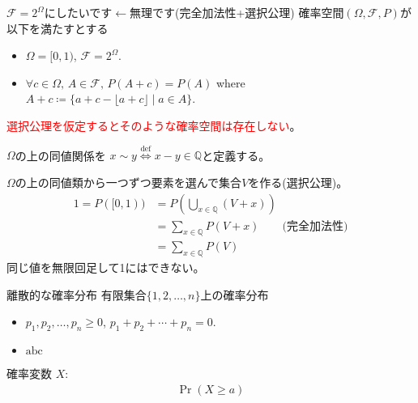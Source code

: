 \documentclass[lualatex,handout]{beamer}
\newcommand{\emm}[1]{\textcolor{red}{#1}}
\theoremstyle{definition}
\begin{document}
\begin{frame}{$\mathcal{F} = 2^\Omega$にしたいです$\leftarrow$無理です(完全加法性+選択公理)}
\small
確率空間$(\Omega,\mathcal{F},P)$が以下を満たすとする
\begin{itemize}
\item $\Omega=[0,1)$, $\mathcal{F} = 2^\Omega$.
\item $\forall c\in\Omega,\, A\in\mathcal{F},\, P(A+c) = P(A)$ where $A+c\coloneq\{a+c-\lfloor a+c\rfloor\mid a\in A\}$.
\end{itemize}
\emm{選択公理を仮定するとそのような確率空間は存在しない}。

\vspace{1em}
$\Omega$の上の同値関係を
$x\sim y\stackrel{\mathrm{def}}{\iff} x-y \in\mathbb{Q}$と定義する。

\vspace{1em}
$\Omega$の上の同値類から一つずつ要素を選んで集合$V$を作る(選択公理)。
%
\begin{align*}
1 = P([0,1)) &= P\left(\bigcup_{x\in\mathbb{Q}} (V + x)\right)\\
&= \sum_{x\in\mathbb{Q}} P\left(V + x\right)\qquad\text{(完全加法性)}\\
&= \sum_{x\in\mathbb{Q}} P\left(V\right)
\end{align*}
同じ値を無限回足して1にはできない。
\end{frame}

\begin{frame}{離散的な確率分布}
有限集合$\{1,2,\dotsc,n\}$上の確率分布
\begin{itemize}
\item $p_1, p_2, \dotsc, p_n\ge 0$, $p_1+p_2+\dotsb+p_n=0$.
\item $\mathrm{abc}$
\end{itemize}
\end{frame}
\fi

\begin{frame}{確率変数}
$X\colon $
\begin{align*}
\Pr(X\ge a)
\end{align*}
\end{frame}
\end{document}
